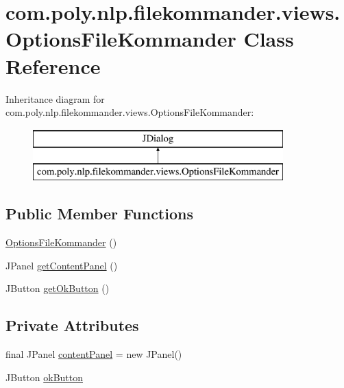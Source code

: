 \hypertarget{classcom_1_1poly_1_1nlp_1_1filekommander_1_1views_1_1_options_file_kommander}{\section{com.\-poly.\-nlp.\-filekommander.\-views.\-Options\-File\-Kommander Class Reference}
\label{classcom_1_1poly_1_1nlp_1_1filekommander_1_1views_1_1_options_file_kommander}
}
Inheritance diagram for com.\-poly.\-nlp.\-filekommander.\-views.\-Options\-File\-Kommander\-:\begin{figure}[H]
\begin{center}
\leavevmode
\includegraphics[height=2.000000cm]{classcom_1_1poly_1_1nlp_1_1filekommander_1_1views_1_1_options_file_kommander}
\end{center}
\end{figure}
\subsection*{Public Member Functions}
\begin{DoxyCompactItemize}
\item 
\hyperlink{classcom_1_1poly_1_1nlp_1_1filekommander_1_1views_1_1_options_file_kommander_afff9327e0d62d1b57fb6e19299a1e203}{Options\-File\-Kommander} ()
\item 
J\-Panel \hyperlink{classcom_1_1poly_1_1nlp_1_1filekommander_1_1views_1_1_options_file_kommander_a9620544d34bd81849c5883f30a84bab8}{get\-Content\-Panel} ()
\item 
J\-Button \hyperlink{classcom_1_1poly_1_1nlp_1_1filekommander_1_1views_1_1_options_file_kommander_aac58d7d8c360a50897f4324322a918c7}{get\-Ok\-Button} ()
\end{DoxyCompactItemize}
\subsection*{Private Attributes}
\begin{DoxyCompactItemize}
\item 
final J\-Panel \hyperlink{classcom_1_1poly_1_1nlp_1_1filekommander_1_1views_1_1_options_file_kommander_a566cf729d42553b326dc4eaaf52cd9d8}{content\-Panel} = new J\-Panel()
\item 
J\-Button \hyperlink{classcom_1_1poly_1_1nlp_1_1filekommander_1_1views_1_1_options_file_kommander_a0f8aef931bc85b51505210be4fbc87e1}{ok\-Button}
\end{DoxyCompactItemize}
